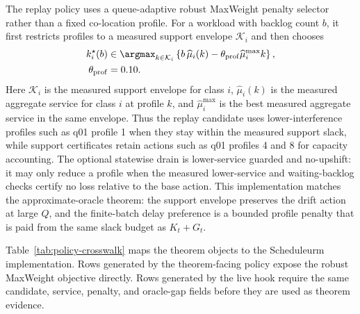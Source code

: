 \documentclass[opre,dblanonrev]{informs4}
\begin{document}
The replay policy uses a queue-adaptive robust MaxWeight penalty selector rather
than a fixed co-location profile.  For a workload with backlog count \(b\), it
first restricts profiles to a measured support envelope \(\mathcal K_i\) and
then chooses
\begin{equation}
  \begin{aligned}
  k_i^\star(b)
  &\in
  \argmax_{k\in\mathcal K_i}
  \left\{
  b\,\widehat\mu_i(k)
  -\theta_{\mathrm{prof}}\widehat\mu_i^{\max}k
  \right\},\\
  \theta_{\mathrm{prof}}&=0.10 .
  \end{aligned}
\end{equation}
Here \(\mathcal K_i\) is the measured support envelope for class \(i\),
\(\widehat\mu_i(k)\) is the measured aggregate service for class \(i\) at
profile \(k\), and \(\widehat\mu_i^{\max}\) is the best measured aggregate
service in the same envelope.  Thus the replay candidate uses lower-interference
profiles such as q01 profile 1 when they stay within the measured support slack,
while support certificates retain actions such as q01 profiles 4 and 8 for
capacity accounting.  The optional statewise drain is lower-service guarded and
no-upshift: it may only reduce a profile when the measured lower-service and
waiting-backlog checks certify no loss relative to the base action.  This
implementation matches the approximate-oracle theorem:
the support envelope preserves the drift action at large \(Q\), and the
finite-batch delay preference is a bounded profile penalty that is paid from the
same slack budget as \(K_t+G_t\).

Table~\ref{tab:policy-crosswalk} maps the theorem objects to the Scheduleurm
implementation.  Rows generated by the theorem-facing policy expose the robust
MaxWeight objective directly.  Rows generated by the live hook require the same
candidate, service, penalty, and oracle-gap fields before they are used as
theorem evidence.
\end{document}
